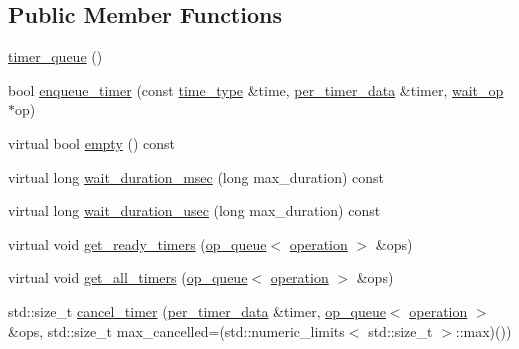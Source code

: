 \subsection*{Public Member Functions}
\begin{DoxyCompactItemize}
\item 
\hyperlink{classasio_1_1detail_1_1timer__queue_a310054c0104ba91d2f25c08900d36546}{timer\+\_\+queue} ()
\item 
bool \hyperlink{classasio_1_1detail_1_1timer__queue_afe7e11534e17e57c79a67d8dfed18876}{enqueue\+\_\+timer} (const \hyperlink{classasio_1_1detail_1_1timer__queue_aed8a9658d61debbeb8d201f4dc74e139}{time\+\_\+type} \&time, \hyperlink{classasio_1_1detail_1_1timer__queue_1_1per__timer__data}{per\+\_\+timer\+\_\+data} \&timer, \hyperlink{classasio_1_1detail_1_1wait__op}{wait\+\_\+op} $\ast$op)
\item 
virtual bool \hyperlink{classasio_1_1detail_1_1timer__queue_a0310af5fdd02b43eaccdab1f8c84ed29}{empty} () const 
\item 
virtual long \hyperlink{classasio_1_1detail_1_1timer__queue_a458b0fbc6d9d308d44b9c88b0d799f2e}{wait\+\_\+duration\+\_\+msec} (long max\+\_\+duration) const 
\item 
virtual long \hyperlink{classasio_1_1detail_1_1timer__queue_a07a7fa16514869c7959d16de73fb7b28}{wait\+\_\+duration\+\_\+usec} (long max\+\_\+duration) const 
\item 
virtual void \hyperlink{classasio_1_1detail_1_1timer__queue_aa179e47a3b43c05ad4f54e34936908d9}{get\+\_\+ready\+\_\+timers} (\hyperlink{classasio_1_1detail_1_1op__queue}{op\+\_\+queue}$<$ \hyperlink{namespaceasio_1_1detail_a338968609bec20e37145309f8f9ec936}{operation} $>$ \&ops)
\item 
virtual void \hyperlink{classasio_1_1detail_1_1timer__queue_a98df8b86b9c56b226e9e434b5cd32af8}{get\+\_\+all\+\_\+timers} (\hyperlink{classasio_1_1detail_1_1op__queue}{op\+\_\+queue}$<$ \hyperlink{namespaceasio_1_1detail_a338968609bec20e37145309f8f9ec936}{operation} $>$ \&ops)
\item 
std\+::size\+\_\+t \hyperlink{classasio_1_1detail_1_1timer__queue_afdc1b9f602dd8721522693d9d5157887}{cancel\+\_\+timer} (\hyperlink{classasio_1_1detail_1_1timer__queue_1_1per__timer__data}{per\+\_\+timer\+\_\+data} \&timer, \hyperlink{classasio_1_1detail_1_1op__queue}{op\+\_\+queue}$<$ \hyperlink{namespaceasio_1_1detail_a338968609bec20e37145309f8f9ec936}{operation} $>$ \&ops, std\+::size\+\_\+t max\+\_\+cancelled=(std\+::numeric\+\_\+limits$<$ std\+::size\+\_\+t $>$\+::max)())
\end{DoxyCompactItemize}


